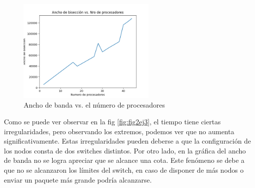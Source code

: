 \begin{figure}[H]
    \centering
    \includegraphics[width=0.60\textwidth]{Images/ej3/fig1ej3.png}
    \caption{Ancho de banda vs. el número de procesadores}
    \label{fig:fig1ej3}
\end{figure}

Como se puede ver observar en la fig \ref{fig:fig2ej3}, el tiempo tiene ciertas irregularidades, pero observando los extremos, podemos ver que no aumenta significativamente. Estas irregularidades pueden deberse a que la configuración de los nodos consta de dos switches distintos. Por otro lado, en la gráfica del ancho de banda no se logra apreciar que se alcance una cota. Este fenómeno se debe a que no se alcanzaron los límites del switch, en caso de disponer de más nodos o enviar un paquete más grande podría alcanzarse. 